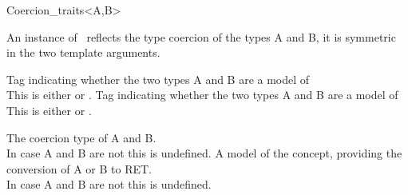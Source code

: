 \begin{ccRefClass}{Coercion_traits<A,B>}

\ccDefinition

An instance of \ccClassTemplateName\ reflects the type coercion of the types
{\sc A} and {\sc B}, it is symmetric in the two template arguments. 


\ccTypes


        { Tag indicating whether the two types A and B are a model of  \\
          This is either  or . }
        { Tag indicating whether the two types A and B are a model of  \\
          This is either  or . }

        {The coercion type of {\sc A} and {\sc B}. \\
        In case A and B are not  this is undefined.  }
        {A model of the  concept, providing the conversion of {\sc A} or {\sc B} to {\sc RET}. \\
        In case A and B are not  this is undefined.  }


\ccSeeAlso
{} \\
\\
\end{ccRefClass} 